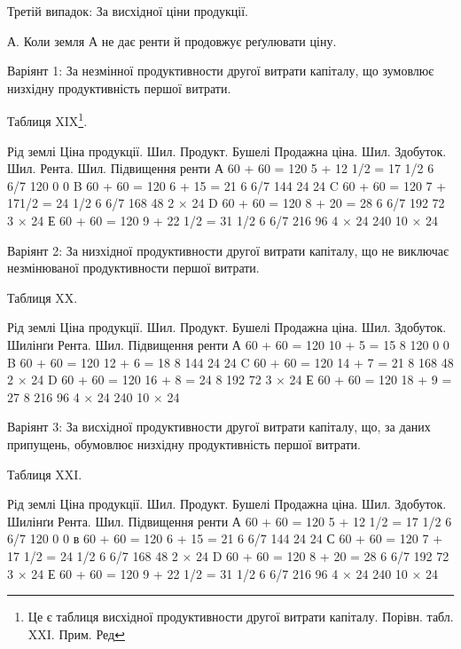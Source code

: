 Третій випадок: За висхідної ціни продукції.

А. Коли земля А не дає ренти й продовжує реґулювати ціну.

Варіянт 1: За незмінної продуктивности другої витрати капіталу, що зумовлює
низхідну продуктивність першої витрати.

Таблиця XIX\footnote*{
Це є таблиця висхідної продуктивности другої витрати капіталу. Порівн. табл. XXI. Прим. Ред
}.

Рід  землі
Ціна продукції. Шил.
Продукт. Бушелі
Продажна ціна. Шил.
Здобуток. Шил.
Рента. Шил.
Підвищення ренти
А    60 + 60 = 120    5 + 12 1/2 = 17 1/2     6 6/7    120            0    0
B    60 + 60 = 120    6 + 15 = 21                    6 6/7    144     24    24
C    60 + 60 = 120    7 + 171/2 = 24 1/2     6 6/7    168           48    2 × 24
D    60 + 60 = 120    8 + 20 = 28                    6 6/7    192           72    3 × 24
Е    60 + 60 = 120    9 + 22 1/2 = 31 1/2    6 6/7    216           96    4 × 24
                    240              10 × 24

Варіянт 2: За низхідної продуктивности другої витрати капіталу, що не виключає
незмінюваної продуктивности першої витрати.

Таблиця XX.

Рід  землі
 Ціна продукції. Шил.
Продукт. Бушелі
Продажна ціна. Шил.
Здобуток. Шилінґи
Рента. Шил.
Підвищення ренти
А 60 + 60 = 120 10 + 5 = 15 8 120 0 0
B 60 + 60 = 120 12 + 6 = 18 8 144 24 24
C 60 + 60 = 120 14 + 7 = 21 8 168 48 2 × 24
D 60 + 60 = 120 16 + 8 = 24 8 192 72 3 × 24
Е 60 + 60 = 120 18 + 9 = 27 8 216 96 4 × 24
                    240    10 × 24

Варіянт 3: За висхідної продуктивности другої витрати капіталу, що, за даних
припущень, обумовлює низхідну продуктивність першої витрати.

Таблиця XXI.

Рід  землі
Ціна продукції. Шил.
Продукт. Бушелі
Продажна  ціна. Шил.
Здобуток. Шилінґи
Рента. Шил.
Підвищення ренти
А    60 + 60 = 120    5 + 12 1/2 = 17 1/2      6 6/7    120            0    0
в    60 + 60 = 120    6 + 15 = 21                    6 6/7    144            24    24
С    60 + 60 = 120    7 + 17 1/2 = 24 1/2      6 6/7    168            48    2 × 24
D    60 + 60 = 120    8 + 20 = 28                    6 6/7    192            72    3 × 24
Е    60 + 60 = 120    9 + 22 1/2 = 31 1/2       6 6/7    216            96    4 × 24
 240 10 × 24